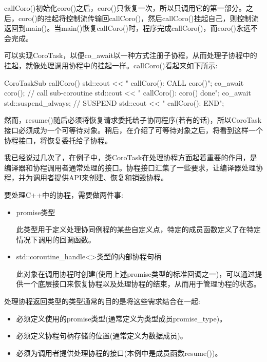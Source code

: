 callCoro()初始化coro()之后，coro()只恢复一次，所以只调用它的第一部分。之后，coro()的挂起将控制流传输回callCoro()，然后callCoro()挂起自己，则控制流返回到main()。当main()恢复callCoro()时，程序完成callCoro()，而coro()永远不会完成。


可以实现CoroTask，以便co\_await以一种方式注册子协程，从而处理子协程中的挂起，就像处理调用协程中的挂起一样。callCoro()看起来如下所示:

\begin{cpp}
CoroTaskSub callCoro()
{
	std::cout << " callCoro(): CALL coro()\n";
	co_await coro(); // call sub-coroutine
	std::cout << " callCoro(): coro() done\n";
	co_await std::suspend_always{}; // SUSPEND
	std::cout << " callCoro(): END\n";
}
\end{cpp}

然而，resume()随后必须将恢复请求委托给子协同程序(若有的话)，所以CoroTask接口必须成为一个可等待对象。稍后，在介绍了可等待对象之后，将看到这样一个协程接口，将恢复委托给子协程。


我已经说过几次了，在例子中，类CoroTask在处理协程方面起着重要的作用，是编译器和协程调用者通常处理的接口。协程接口汇集了一些要求，让编译器处理协程，并为调用者提供API来创建、恢复和销毁协程。

要处理C++中的协程，需要做两件事:

\begin{itemize}
\item
promise类型

此类型用于定义处理协同例程的某些自定义点，特定的成员函数定义了在特定情况下调用的回调函数。

\item
std::coroutine\_handle<>类型的内部协程句柄

此对象在调用协程时创建(使用上述promise类型的标准回调之一)，可以通过提供一个底层接口来恢复协程以及处理协程的结束，从而用于管理协程的状态。
\end{itemize}

处理协程返回类型的类型通常的目的是将这些需求结合在一起:

\begin{itemize}
\item
必须定义使用的promise类型(通常定义为类型成员promise\_type)。

\item
必须定义协程句柄存储的位置(通常定义为数据成员)。

\item
必须为调用者提供处理协程的接口(本例中是成员函数resume())。
\end{itemize}

